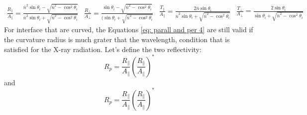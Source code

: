 \begin{subequations}
\begin{equation}
\begin{aligned}
\frac{R_{\parallel}}{A_{\parallel}} = \frac{\overline{n}^2 \sin \theta_i - \sqrt{\overline{n}^2 - \cos^2 \theta_i}}{\overline{n}^2 \sin \theta_i + \sqrt{\overline{n}^2 - \cos^2 \theta_i}} 
\end{aligned}
\label{eq: R/A parll 3}
\end{equation}
\begin{equation}
\begin{aligned}
\frac{R_{\perp}}{A_{\perp}} = \frac{\sin \theta_i - \sqrt{\overline{n}^2 - \cos^2 \theta_i}}{(\sin \theta_i  +  \sqrt{\overline{n}^2 - \cos^2 \theta_i}} 
\end{aligned}
\label{eq: R/A perp 3}
\end{equation}
\begin{equation}
\begin{aligned}
\frac{T_{\parallel}}{A_{\parallel}} = \frac{2\overline{n} \sin \theta_i }{\overline{n}^2 \sin \theta_i  +  \sqrt{\overline{n}^2 - \cos^2 \theta_i}} 
\end{aligned}
\label{eq: T/A parll 3}
\end{equation}
\begin{equation}
\begin{aligned}
\frac{T_{\perp}}{A_{\perp}} = \frac{2 \sin \theta_i }{ \sin \theta_i  +  \sqrt{\overline{n}^2 - \cos^2 \theta_i}} 
\end{aligned}
\label{eq: T/A perp 3}
\end{equation}
\label{eq: parall and per 4}
\end{subequations}
For interface that are curved, the Equations \ref{eq: parall and per 4} are still valid if the curvature radius is much grater that the wavelength, condition that is satisfied for the X-ray radiation.
Let's define the two reflectivity:
\begin{equation}
R_p =\frac{R_{\parallel}}{A_{\parallel}} \left(\frac{R_{\parallel}}{A_{\parallel}} \right)^{*}
\label{eq: Rp}
\end{equation}
\noindent and
\begin{equation}
R_p =\frac{R_{\parallel}}{A_{\parallel}} \left(\frac{R_{\parallel}}{A_{\parallel}} \right)^{*}
\label{eq: Rs}
\end{equation}

